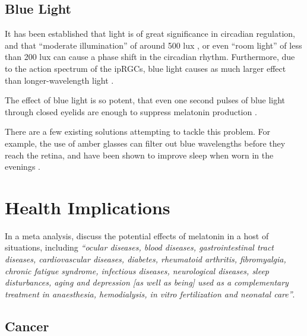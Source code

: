 \subsection{Blue Light}

It has been established that light is of great significance in circadian regulation, and that ``moderate illumination'' of around 500 lux \citep{laaksoOnehourExposureModerate1993}, or even ``room light'' of less than 200 lux \citep{gooleyExposureRoomLight2011} can cause a phase shift in the circadian rhythm. Furthermore, due to the action spectrum of the ipRGCs, blue light causes as much larger effect than longer-wavelength light \citep{lockleyHighSensitivityHuman2003}.

The effect of blue light is so potent, that even one second pulses of blue light through closed eyelids are enough to suppress melatonin production \citep{figueiroTrainBlueLight2013}. 

There are a few existing solutions attempting to tackle this problem. For example, the use of amber glasses can filter out blue wavelengths before they reach the retina, and have been shown to improve sleep when worn in the evenings \citep{kimberlyAmberLensesBlock2009}.






\section{Health Implications}
\label{Sec:Health}


In a meta analysis, \citet{sanchez-barceloClinicalUsesMelatonin2010} discuss the potential effects of melatonin in a host of situations, including \textit{``ocular diseases, blood diseases, gastrointestinal tract diseases, cardiovascular diseases, diabetes, rheumatoid arthritis, fibromyalgia, chronic fatigue syndrome, infectious diseases, neurological diseases, sleep disturbances, aging and depression [as well as being] used as a complementary treatment in anaesthesia, hemodialysis, in vitro fertilization and neonatal care''}.

\subsection{Cancer}

